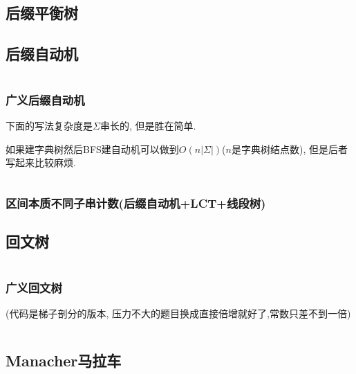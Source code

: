 \documentclass[a4paper, twoside]{article}
\begin{document}
\begin{multicols}{2}
			\subsection{后缀平衡树}
				

			\subsection{后缀自动机}
				\inputminted{cpp}{../src/string/后缀自动机.cpp}

				\subsubsection{广义后缀自动机}
				下面的写法复杂度是$\Sigma$串长的, 但是胜在简单.
				
				如果建字典树然后BFS建自动机可以做到$O\left(n\left|\Sigma\right|\right)$($n$是字典树结点数), 但是后者写起来比较麻烦.
				\inputminted{cpp}{../src/string/广义后缀自动机.cpp}

				\subsubsection[区间本质不同子串计数]{区间本质不同子串计数(后缀自动机+LCT+线段树)}
					

			\subsection{回文树}
				\inputminted{cpp}{../src/string/回文树.cpp}

				\subsubsection{广义回文树}
					(代码是梯子剖分的版本, 压力不大的题目换成直接倍增就好了,常数只差不到一倍)
					\inputminted{cpp}{../src/string/广义回文树.cpp}



			\subsection{Manacher马拉车}
				\inputminted{cpp}{../src/string/manacher.cpp}
			



\end{multicols}
\end{document}
